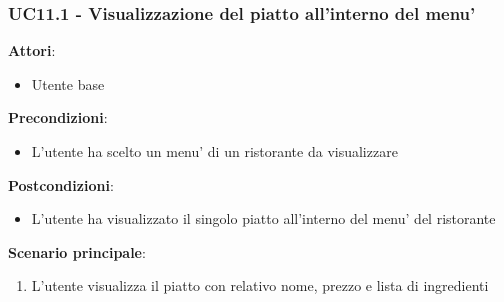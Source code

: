 \subsubsection{UC11.1 - Visualizzazione del piatto all'interno del menu'} \label{usecase:11_1}
\textbf{Attori}:
\begin{itemize}
    \item Utente base
\end{itemize}
\textbf{Precondizioni}:
\begin{itemize}
    \item L'utente ha scelto un menu' di un ristorante da visualizzare
\end{itemize}
\textbf{Postcondizioni}:
\begin{itemize}
    \item L'utente ha visualizzato il singolo piatto all'interno del menu' del ristorante
\end{itemize}
\textbf{Scenario principale}:
\begin{enumerate}
    \item L'utente visualizza il piatto con relativo nome, prezzo e lista di ingredienti
\end{enumerate}
\newpage